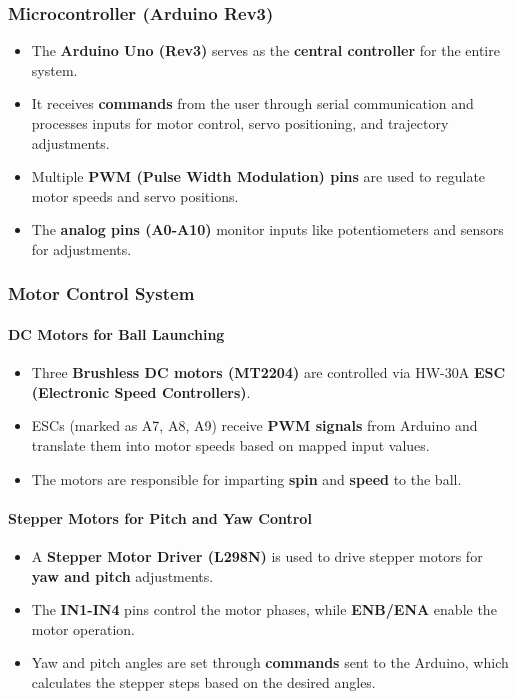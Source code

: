 \documentclass[12pt]{article}
\begin{document}
\subsubsection{Microcontroller (Arduino Rev3)}
\begin{itemize}
    \item The \textbf{Arduino Uno (Rev3)} serves as the \textbf{central controller} for the entire system.
    \item It receives \textbf{commands} from the user through serial communication and processes inputs for motor control, servo positioning, and trajectory adjustments.
    \item Multiple \textbf{PWM (Pulse Width Modulation) pins} are used to regulate motor speeds and servo positions.
    \item The \textbf{analog pins (A0-A10)} monitor inputs like potentiometers and sensors for adjustments.
\end{itemize}

\subsubsection{Motor Control System}
\paragraph{DC Motors for Ball Launching}
\begin{itemize}
    \item Three \textbf{Brushless DC motors (MT2204)} are controlled via HW-30A \textbf{ESC (Electronic Speed Controllers)}.
    \item ESCs (marked as A7, A8, A9) receive \textbf{PWM signals} from Arduino and translate them into motor speeds based on mapped input values.
    \item The motors are responsible for imparting \textbf{spin} and \textbf{speed} to the ball.
\end{itemize}

\paragraph{Stepper Motors for Pitch and Yaw Control}

\begin{itemize}
    \item A \textbf{Stepper Motor Driver (L298N)} is used to drive stepper motors for \textbf{yaw and pitch} adjustments.
    \item The \textbf{IN1-IN4} pins control the motor phases, while \textbf{ENB/ENA} enable the motor operation.
    \item Yaw and pitch angles are set through \textbf{commands} sent to the Arduino, which calculates the stepper steps based on the desired angles.
\end{itemize}
\end{document}
